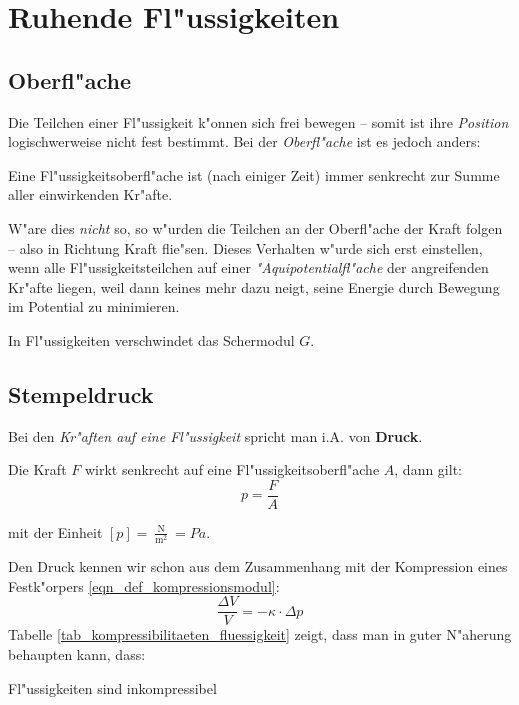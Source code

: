 \section{Ruhende Fl"ussigkeiten}
\label{kap_ruhende-flussigkeiten}


\subsection{Oberfl"ache}
\label{kap_oberflache}


Die Teilchen einer Fl"ussigkeit k"onnen sich frei bewegen -- somit ist
ihre \emph{Position} logischwerweise nicht fest bestimmt. Bei der
\emph{Oberfl"ache} ist es jedoch anders: 
\begin{Wichtig}
Eine Fl"ussigkeitsoberfl"ache ist (nach einiger Zeit) immer senkrecht
  zur Summe aller einwirkenden Kr"afte.
\end{Wichtig}
W"are dies \emph{nicht} so, so w"urden die Teilchen an der Oberfl"ache
der Kraft folgen -- also in Richtung Kraft flie"sen. Dieses Verhalten
w"urde sich erst einstellen, wenn alle Fl"ussigkeitsteilchen auf einer
\emph{"Aquipotentialfl"ache} der angreifenden Kr"afte liegen, weil dann
keines mehr dazu neigt, seine Energie durch Bewegung im Potential zu
minimieren. 

\begin{Wichtig}
   In Fl"ussigkeiten verschwindet das Schermodul $G$.
\end{Wichtig}




\subsection{Stempeldruck}
\label{kap_oberflache-1}


Bei den \emph{Kr"aften auf eine Fl"ussigkeit} spricht man i.A. von
\textbf{Druck}.

\begin{Def}
Die Kraft $F$ wirkt senkrecht auf eine Fl"ussigkeitsoberfl"ache $A$,
dann gilt:
   \begin{equation}
      \label{eqn_def_druck}
      p = \frac{F}{A}
   \end{equation}
\end{Def}
mit der Einheit $[p] = \frac{\operatorname{N}}{\operatorname{m^2}} =
Pa$.

Den Druck kennen wir schon aus dem Zusammenhang mit der Kompression
eines Festk"orpers \eqref{eqn_def_kompressionsmodul}:
$$
\frac{\Delta V}{V} = -\kappa \cdot \Delta p
$$
Tabelle \ref{tab_kompressibilitaeten_fluessigkeit} zeigt, dass man in
guter N"aherung behaupten kann, dass:
\begin{Wichtig}
   Fl"ussigkeiten sind inkompressibel
\end{Wichtig}


